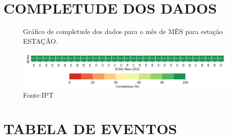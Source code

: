 \documentclass[12pt]{iptex}
\begin{document}
\newpage
\section{COMPLETUDE DOS DADOS}
\label{fig:completude}

\begin{figure}[htb!]
    \centering
	\captionsetup{justification=raggedright,
                  singlelinecheck=false,
                  width=0.4\textwidth,
                  format=plain}
    \caption{Gráfico de completude dos dados para o mês de MÊS para estação ESTAÇÃO.}
    \includegraphics[width=1.0\textwidth]{../figuras/completude.png} %
    \caption*{Fonte:IPT}
	\label{fig:logo}
\end{figure}

\section{TABELA DE EVENTOS}
\label{subsec:tabelas}



\newpage


%



\end{document}
